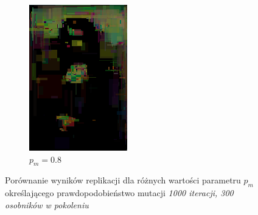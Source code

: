 \begin{figure}[!htb]
\begin{subfigure}[b]{0.3\textwidth}
         \includegraphics[width=\textwidth]{images/mona/1000_300_2/mutation/0_8.png}
         \caption{$p_{m} = 0.8$}
    \end{subfigure}
    \caption{Porównanie wyników replikacji dla różnych wartości parametru $p_{m}$ określającego prawdopodobieństwo mutacji \textit{1000 iteracji, 300 osobników w pokoleniu}}
    \label{fig:mutation_1}
\end{figure}

